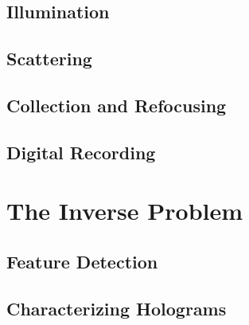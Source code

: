 \subsection{Illumination}



\subsection{Scattering}

  

\subsection{Collection and Refocusing}

\subsection{Digital Recording}

\section{The Inverse Problem}

\subsection{Feature Detection}

\subsection{Characterizing Holograms}
